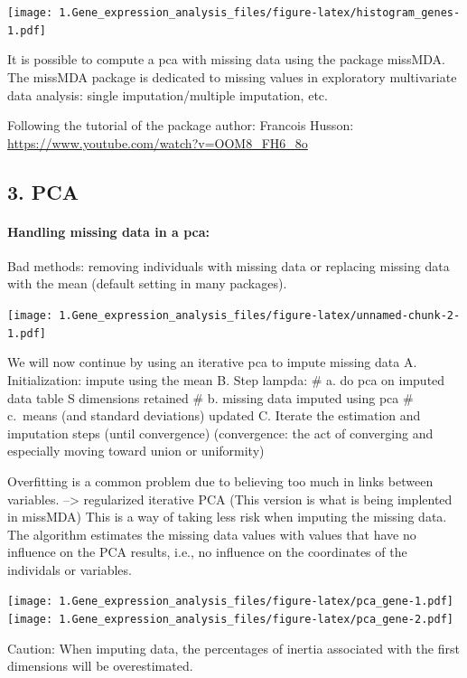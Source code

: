 \documentclass[
]{article}
\begin{document}
\texttt{[image: 1.Gene\_expression\_analysis\_files/figure-latex/histogram\_genes-1.pdf]}

It is possible to compute a pca with missing data using the package
missMDA. The missMDA package is dedicated to missing values in
exploratory multivariate data analysis: single imputation/multiple
imputation, etc.

Following the tutorial of the package author: Francois Husson:
\url{https://www.youtube.com/watch?v=OOM8_FH6_8o}

\hypertarget{pca}{%
\subsection{3. PCA}\label{pca}}

\hypertarget{handling-missing-data-in-a-pca}{%
\paragraph{Handling missing data in a
pca:}\label{handling-missing-data-in-a-pca}}

Bad methods: removing individuals with missing data or replacing missing
data with the mean (default setting in many packages).

\texttt{[image: 1.Gene\_expression\_analysis\_files/figure-latex/unnamed-chunk-2-1.pdf]}

We will now continue by using an iterative pca to impute missing data A.
Initialization: impute using the mean B. Step lampda: \# a. do pca on
imputed data table S dimensions retained \# b. missing data imputed
using pca \# c.~means (and standard deviations) updated C. Iterate the
estimation and imputation steps (until convergence) (convergence: the
act of converging and especially moving toward union or uniformity)

Overfitting is a common problem due to believing too much in links
between variables. --\textgreater{} regularized iterative PCA (This
version is what is being implented in missMDA) This is a way of taking
less risk when imputing the missing data. The algorithm estimates the
missing data values with values that have no influence on the PCA
results, i.e., no influence on the coordinates of the individals or
variables.

\texttt{[image: 1.Gene\_expression\_analysis\_files/figure-latex/pca\_gene-1.pdf]}
\texttt{[image: 1.Gene\_expression\_analysis\_files/figure-latex/pca\_gene-2.pdf]}

Caution: When imputing data, the percentages of inertia associated with
the first dimensions will be overestimated.
\end{document}

